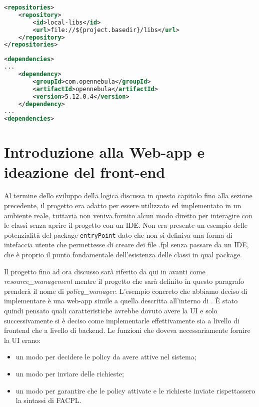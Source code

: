 \begin{lstlisting}[language=XML, xleftmargin=1em, caption=Repository locale, label=code:libsxml]
<repositories>
    <repository>
        <id>local-libs</id>
        <url>file://${project.basedir}/libs</url>
    </repository>
</repositories>
\end{lstlisting}
\begin{lstlisting}[language=XML, xleftmargin=1em, caption=Dipendenza di OpenNebula, label=code:dependencyOpenNebula]
<dependencies>
...
    <dependency>
        <groupId>com.opennebula</groupId>
        <artifactId>opennebula</artifactId>
        <version>5.12.0.4</version>
    </dependency>
...
<dependencies>
\end{lstlisting}

\section{Introduzione alla Web-app e ideazione del front-end}
Al termine dello sviluppo della logica discussa in questo capitolo fino alla sezione precedente, il progetto era adatto per essere utilizzato ed implementato in un ambiente reale, tuttavia non veniva fornito alcun modo diretto per interagire con le classi senza aprire il progetto con un IDE. Non era presente un esempio delle potenzialità del package \texttt{entryPoint} dato che non si definiva una forma di intefaccia utente che permettesse di creare dei file .fpl senza passare da un IDE, che è proprio il punto fondamentale dell'esistenza delle classi in qual package.\par
Il progetto fino ad ora discusso sarà riferito da qui in avanti come \emph{resource\_management} mentre il progetto che sarà definito in questo paragrafo prenderà il nome di \emph{policy\_manager}.
L'esempio concreto che abbiamo deciso di implementare è una web-app simile a quella descritta all'interno di \cite{10.1007/978-3-319-08260-8_6}. È stato quindi pensato quali caratteristiche avrebbe dovuto avere la UI e solo successivamente si è deciso come implementarle effettivamente sia a livello di frontend che a livello di backend. Le funzioni che doveva necessariamente fornire la UI erano:
\begin{itemize}
    \item un modo per decidere le policy da avere attive nel sistema;
    \item un modo per inviare delle richieste;
    \item un modo per garantire che le policy attivate e le richieste inviate rispettassero la sintassi di FACPL.
\end{itemize}
